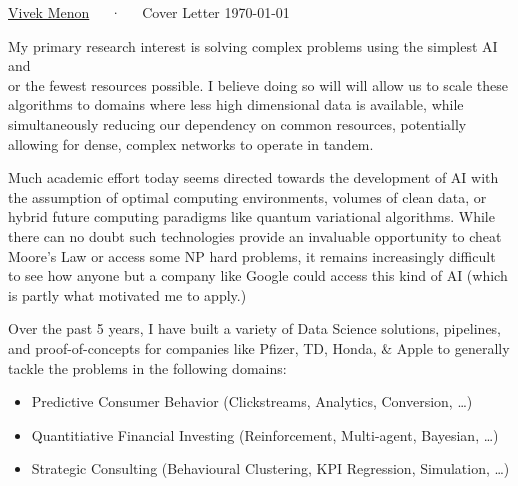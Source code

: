\documentclass[11pt, a4paper]{awesome-cv}
\begin{document}
\makecvheader[R]

\makecvfooter
{\thepage} %
{\href{https://vvkmnn.xyz/}{Vivek Menon}~~~·~~~Cover Letter}
{\today}%



\begin{cvletter}


My primary research interest is solving complex problems using the simplest
AI and\\or the fewest resources possible. I believe doing so will will allow us to scale
these algorithms to domains where less high dimensional data is available, while
simultaneously reducing our dependency on common resources, potentially allowing
for dense, complex networks to operate in tandem.

Much academic effort today seems directed towards the development of AI
with the assumption of optimal computing environments, volumes of clean data, or
hybrid future computing paradigms like quantum variational algorithms. While
there can no doubt such technologies provide an invaluable opportunity to
cheat Moore's Law or access some NP hard problems, it remains increasingly
difficult to see how anyone but a company like Google could access this kind of AI (which is
partly what motivated me to apply.)

Over the past 5 years, I have built a variety of Data Science solutions,
pipelines, and proof-of-concepts for companies like Pfizer,
TD, Honda, \& Apple to generally tackle the problems in the following domains:
\begin{itemize}
\item Predictive Consumer Behavior (Clickstreams, Analytics, Conversion, \ldots{})
\item Quantitiative Financial Investing (Reinforcement, Multi-agent, Bayesian, \ldots{})
\item Strategic Consulting (Behavioural Clustering, KPI Regression, Simulation, \ldots{})
\end{itemize}


\end{cvletter}
\end{document}
